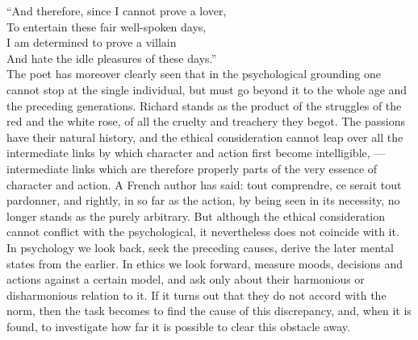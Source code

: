 \documentclass[12pt,a4paper,openany]{book}
\newcommand{\opage}[1]{\marginnote{\footnotesize\textit{[#1]}}}
\begin{document}
``And therefore, since I cannot prove a lover,\\
To entertain these fair well-spoken days,\\
I am determined to prove a villain\\
And hate the idle pleasures of these days.''\\
The poet has moreover clearly seen that in the psychological grounding one
cannot stop at the single individual, but must go beyond it to the whole age
and the preceding generations. Richard stands as the product of the
struggles of the red and the white rose, of all the cruelty and treachery
they begot. The passions have their natural history, and the ethical
consideration cannot leap over all the intermediate links by which character
and action first become intelligible, --- intermediate links which are
therefore properly parts of the very essence of \opage{141}character and
action. A French author has said: tout comprendre, ce serait tout pardonner,
and rightly, in so far as the action, by being seen in its necessity, no
longer stands as the purely arbitrary. But although the ethical
consideration cannot conflict with the psychological, it nevertheless does
not coincide with it. In psychology we look back, seek the preceding causes,
derive the later mental states from the earlier. In ethics we look forward,
measure moods, decisions and actions against a certain model, and ask only
about their harmonious or disharmonious relation to it. If it turns out that
they do not accord with the norm, then the task becomes to find the cause of
this discrepancy, and, when it is found, to investigate how far it is
possible to clear this obstacle away.
\end{document}
